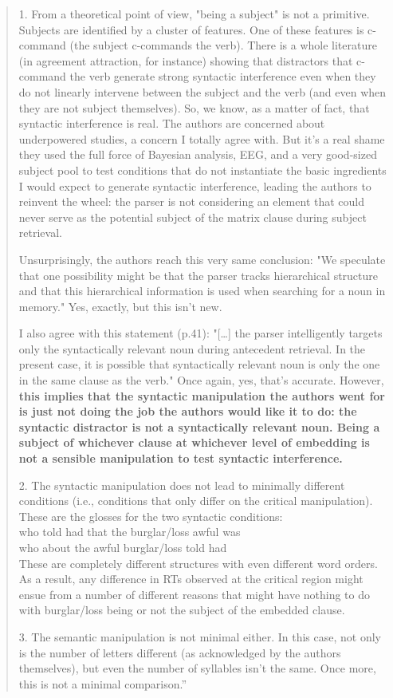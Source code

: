 \documentclass[12pt]{article}
\begin{document}
\begin{quote}
1. From a theoretical point of view, "being a subject" is not a primitive. Subjects are identified by a cluster of features. One of these features is c-command (the subject c-commands the verb). There is a whole literature (in agreement attraction, for instance) showing that distractors that c-command the verb generate strong syntactic interference even when they do not linearly intervene between the subject and the verb (and even when they are not subject themselves). So, we know, as a matter of fact, that syntactic interference is real.
The authors are concerned about underpowered studies, a concern I totally agree with. But it's a real shame they used the full force of Bayesian analysis, EEG, and a very good-sized subject pool to test conditions that do not instantiate the basic ingredients I would expect to generate syntactic interference, leading the authors to reinvent the wheel: the parser is not considering an element that could never serve as the potential subject of the matrix clause during subject retrieval.

Unsurprisingly, the authors reach this very same conclusion: "We speculate that one possibility might be that the parser tracks hierarchical structure and that this hierarchical information is used when searching for a noun in memory." Yes, exactly, but this isn't new.

I also agree with this statement (p.41): "[…] the parser intelligently targets only the syntactically relevant noun during antecedent retrieval. In the present case, it is possible that syntactically relevant noun is only the one in the same clause as the verb." Once again, yes, that's accurate. However, \textbf{this implies that the syntactic manipulation the authors went for is just not doing the job the authors would like it to do: the syntactic distractor is not a syntactically relevant noun. Being a subject of whichever clause at whichever level of embedding is not a sensible manipulation to test syntactic interference.}

2. The syntactic manipulation does not lead to minimally different conditions (i.e., conditions that only differ on the critical manipulation). These are the glosses for the two syntactic conditions:\\

who told had that the burglar/loss awful was\\
who about the awful burglar/loss told had\\

These are completely different structures with even different word orders. As a result, any difference in RTs observed at the critical region might ensue from a number of different reasons that might have nothing to do with burglar/loss being or not the subject of the embedded clause.

3. The semantic manipulation is not minimal either. In this case, not only is the number of letters different (as acknowledged by the authors themselves), but even the number of syllables isn't the same. Once more, this is not a minimal comparison.''
\end{quote}
\end{document}
